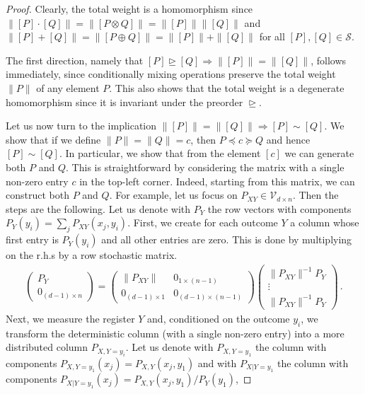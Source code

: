 \documentclass[aps,pra,11pt,onecolumn,nofootinbib,tightenlines]{revtex4-2}
\theoremstyle{definition}
\newcommand{\cS}{\mathcal{S}}
\newcommand{\V}{\mathcal{V}}
\newcommand{\rgeq}{\trianglerighteq}
\begin{document}
\begin{proof}
Clearly, the total weight is a homomorphism since $\|[P]\cdot [Q]\|=\|[P\otimes Q]\|=\|[P]\|\|[Q]\|$ and $\|[P]+[Q]\|=\|[P\oplus Q]\|=\|[P]\|+\|[Q]\|$ for all $[P],[Q]\in\cS$. 

The first direction, namely that $[P] \rgeq [Q] \Rightarrow \|[P]\| = \|[Q]\|$, follows immediately, since conditionally mixing operations preserve the total weight $\|P\|$ of any element $P$. This also shows that the total weight is a degenerate homomorphism since it is invariant under the preorder $\rgeq$.

Let us now turn to the implication $\|[P]\|=\|[Q]\|\Rightarrow [P]\sim [Q]$.  We show that if we define $\|P\|=\|Q\| = c$, then $P\preceq c\succeq Q$ 
and hence $[P]\sim [Q]$. In particular, we show that from the element $[c]$ we can generate both $P$ and $Q$. This is straightforward by considering the matrix with a single non-zero entry $c$ in the top-left corner. Indeed, starting from this matrix, we can construct both $P$ and $Q$. For example, let us focus on $P_{XY} \in \V_{d\times n}$.
Then the steps are the following. Let us denote with $P_{Y}$ the row vectors with components $P_Y(y_i) = \sum_jP_{XY}(x_j,y_i)$. 
First, we create for each outcome $Y$ a column whose first entry is $P_Y(y_i)$ and all other entries are zero. This is done by multiplying on the r.h.s by a row stochastic matrix.
\begin{align}
\begin{pmatrix}
     P_{Y} \\
    0_{(d-1) \times n}   
\end{pmatrix}=
\begin{pmatrix}
    \|P_{XY}\| & 0_{1\times (n-1)} \\
    0_{(d-1)\times 1} & 0_{(d-1)\times (n-1)}
\end{pmatrix} 
\begin{pmatrix}
    \|P_{XY}\|^{-1} P_{Y} \\
    \vdots \\
    \|P_{XY}\|^{-1} P_{Y}    
\end{pmatrix}\,.
\end{align}
Next, we measure the register $Y$ and, conditioned on the outcome $y_i$, we transform the deterministic column (with a single non-zero entry) into a more distributed column $P_{X,Y=y_i}$. Let us denote with $P_{X,Y=y_1}$ the column with components $P_{X,Y=y_1}(x_j)=P_{X,Y}(x_j,y_1)$ and with $P_{X|Y=y_1}$ the column with components $P_{X|Y=y_1}(x_j)=P_{X,Y}(x_j,y_1)/P_Y(y_1)$,

\end{proof}
\end{document}
